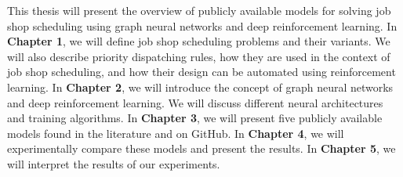 \par
This thesis will present the overview of publicly available models for solving job shop scheduling using graph neural networks and deep reinforcement learning. In \textbf{Chapter 1}, we will define job shop scheduling problems and their variants. We will also describe priority dispatching rules, how they are used in the context of job shop scheduling, and how their design can be automated using reinforcement learning. In \textbf{Chapter 2}, we will introduce the concept of graph neural networks and deep reinforcement learning. We will discuss different neural architectures and training algorithms. In \textbf{Chapter 3}, we will present five publicly available models found in the literature and on GitHub. In \textbf{Chapter 4}, we will experimentally compare these models and present the results. In \textbf{Chapter 5}, we will interpret the results of our experiments.